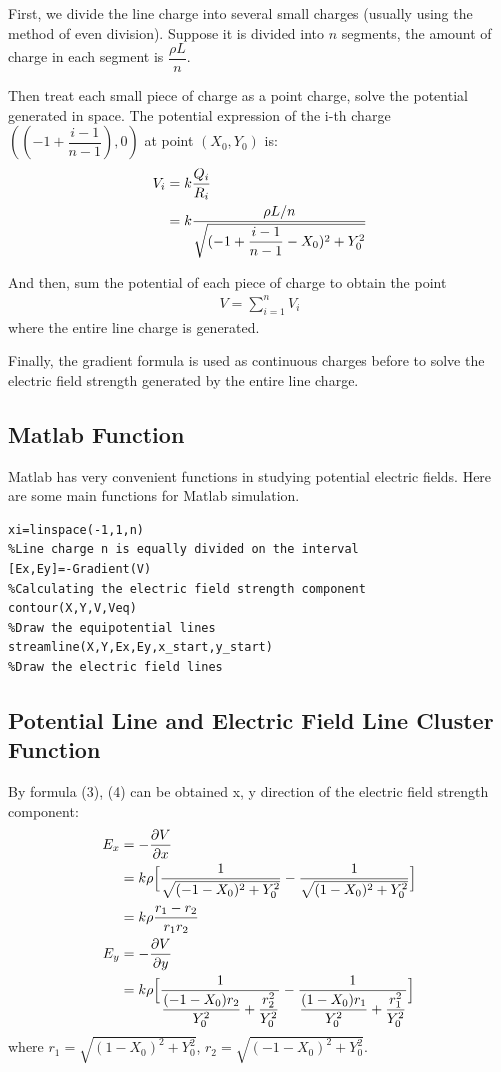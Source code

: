 \documentclass[journal,twocolumn,letterpaper]{IEEEJERM}
\begin{document}
First, we divide the line charge into several small charges (usually using the method of even division). Suppose it is divided into $n$ segments, the amount of charge in each segment is $\dfrac{\rho L}{n}$.

Then treat each small piece of charge as a point charge, solve the potential generated in space. The potential expression of the i-th charge $((-1+\dfrac{i-1}{n-1}),0)$ at point $(X_0,Y_0)$ is:
\begin{align}
V_i&=k\dfrac{Q_i}{R_i} \notag \\
&=k\dfrac{\rho L/n}{\sqrt{(-1+\dfrac{i-1}{n-1}-X_0)^2+Y_0^2}}
\end{align}

And then, sum the potential of each piece of charge to obtain the point 
\begin{align}
V=\sum\limits_{i=1}^n V_i
\end{align}
where the entire line charge is generated. 

Finally, the gradient formula is used as continuous charges before to solve the electric field strength generated by the entire line charge.

\subsection{Matlab Function}
Matlab has very convenient functions in studying potential electric fields. Here are some main functions for Matlab simulation.
\begin{lstlisting}
xi=linspace(-1,1,n) 
%Line charge n is equally divided on the interval
[Ex,Ey]=-Gradient(V) 
%Calculating the electric field strength component
contour(X,Y,V,Veq)   
%Draw the equipotential lines
streamline(X,Y,Ex,Ey,x_start,y_start)   
%Draw the electric field lines
\end{lstlisting}

\subsection{Potential Line and Electric Field Line Cluster Function}
By formula (3), (4) can be obtained x, y direction of the electric field strength component:
\begin{align}
E_x&=-\dfrac{\partial V}{\partial x} \notag \\
&=k\rho \Big[\dfrac{1}{\sqrt{(-1-X_0)^2+Y_0^2}}-\dfrac{1}{\sqrt{(1-X_0)^2+Y_0^2}}  \Big] \notag \\
&=k\rho \dfrac{r_1-r_2}{r_1r_2}\\
E_y&=-\dfrac{\partial V}{\partial y} \notag \\
&=k\rho \Big[\dfrac{1}{\dfrac{(-1-X_0)r_2}{Y_0^2}+\dfrac{r_2^2}{Y_0^2}}-\dfrac{1}{\dfrac{(1-X_0)r_1}{Y_0^2}+\dfrac{r_1^2}{Y_0^2}} \Big]
\end{align}
where $r_1=\sqrt{(1-X_0)^2+Y_0^2}$, $r_2=\sqrt{(-1-X_0)^2+Y_0^2}$.\\
\end{document}
